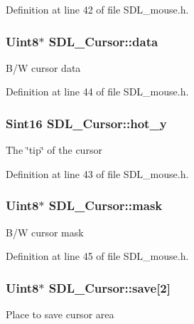 Definition at line 42 of file S\+D\+L\+\_\+mouse.\+h.

\hypertarget{structSDL__Cursor_ae7f8c81028205f9359f0171f2a82ec04}{
\subsubsection[{data}]{\setlength{\rightskip}{0pt plus 5cm}Uint8$\ast$ S\+D\+L\+\_\+\+Cursor\+::data}}\label{structSDL__Cursor_ae7f8c81028205f9359f0171f2a82ec04}
B/\+W cursor data 

Definition at line 44 of file S\+D\+L\+\_\+mouse.\+h.

\hypertarget{structSDL__Cursor_a154ec5999705b912aa09b1f1bacb3275}{
\subsubsection[{hot\+\_\+y}]{\setlength{\rightskip}{0pt plus 5cm}Sint16 S\+D\+L\+\_\+\+Cursor\+::hot\+\_\+y}}\label{structSDL__Cursor_a154ec5999705b912aa09b1f1bacb3275}
The \char`\"{}tip\char`\"{} of the cursor 

Definition at line 43 of file S\+D\+L\+\_\+mouse.\+h.

\hypertarget{structSDL__Cursor_afaec3f604b8a83986bab02eee024c5eb}{
\subsubsection[{mask}]{\setlength{\rightskip}{0pt plus 5cm}Uint8$\ast$ S\+D\+L\+\_\+\+Cursor\+::mask}}\label{structSDL__Cursor_afaec3f604b8a83986bab02eee024c5eb}
B/\+W cursor mask 

Definition at line 45 of file S\+D\+L\+\_\+mouse.\+h.

\hypertarget{structSDL__Cursor_a44a8edebf057e76e048512a57c5630e0}{
\subsubsection[{save}]{\setlength{\rightskip}{0pt plus 5cm}Uint8$\ast$ S\+D\+L\+\_\+\+Cursor\+::save\mbox{[}2\mbox{]}}}\label{structSDL__Cursor_a44a8edebf057e76e048512a57c5630e0}
Place to save cursor area 

